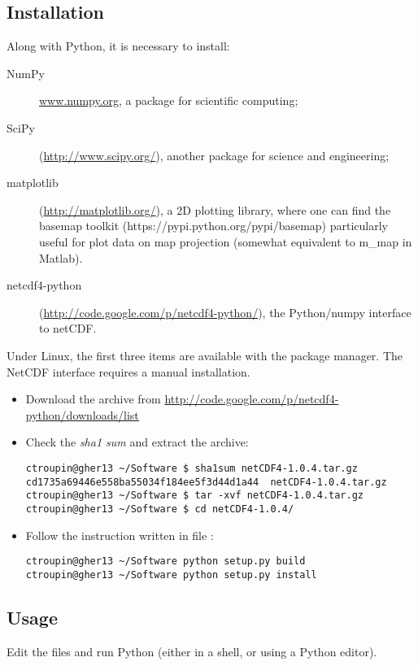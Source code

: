 \subsection{Installation}

Along with Python, it is necessary to install:
\begin{description}
\item[NumPy] \url{www.numpy.org}, a package for scientific computing;
\item[SciPy] (\url{http://www.scipy.org/}), another package for science and engineering;
\item[matplotlib] (\url{http://matplotlib.org/}), a 2D plotting library, where one can find the basemap toolkit (https://pypi.python.org/pypi/basemap) particularly useful for plot data on map projection (somewhat equivalent to m\_map in Matlab).
\item[netcdf4-python] (\url{http://code.google.com/p/netcdf4-python/}), the Python/numpy interface to netCDF.
\end{description}

Under Linux, the first three items are available with the package manager. The NetCDF interface requires a manual installation.

\begin{itemize}
\item Download the archive from \url{http://code.google.com/p/netcdf4-python/downloads/list}
\item Check the \textit{sha1 sum} and extract the archive:
\begin{lstlisting}[style=Bash]
ctroupin@gher13 ~/Software $ sha1sum netCDF4-1.0.4.tar.gz 
cd1735a69446e558ba55034f184ee5f3d44d1a44  netCDF4-1.0.4.tar.gz
ctroupin@gher13 ~/Software $ tar -xvf netCDF4-1.0.4.tar.gz 
ctroupin@gher13 ~/Software $ cd netCDF4-1.0.4/
\end{lstlisting}
\item Follow the instruction written in file :
\begin{lstlisting}[style=Bash]
ctroupin@gher13 ~/Software python setup.py build
ctroupin@gher13 ~/Software python setup.py install
\end{lstlisting}
\end{itemize}

\subsection{Usage}

Edit the files and run Python (either in a shell, or using a Python editor).


